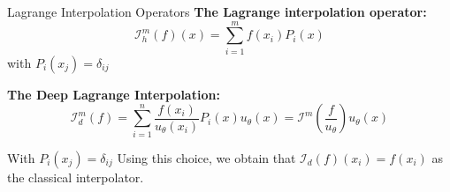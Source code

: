 \begin{frame}{Lagrange Interpolation Operators}
    \textbf{The Lagrange interpolation operator:}
    \begin{equation*}
        \mathcal{I}_h^m(f)(x)=\sum_{i=1}^m f\left(x_i\right) P_i(x)
    \end{equation*} 
    with $P_i\left(x_j\right)=\delta_{i j}$


    \textbf{The Deep Lagrange Interpolation:}
    \begin{equation*}
        \mathcal{I}_d^m(f)=\sum_{i=1}^n \frac{f\left(x_i\right)}{u_\theta\left(x_i\right)} P_i(x) u_\theta(x)=\mathcal{I}^m\left(\frac{f}{u_\theta}\right) u_\theta(x)
    \end{equation*}

    With $P_i\left(x_j\right)=\delta_{i j}$
    Using this choice, we obtain that $\mathcal{I}_d(f)\left(x_i\right)=f\left(x_i\right)$ as the classical interpolator.
    



\end{frame}
